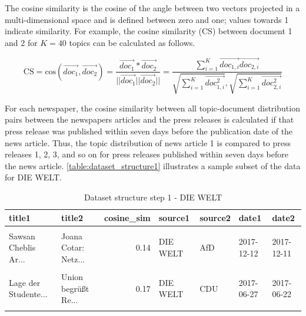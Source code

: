 \documentclass[
  12pt,
]{article}
\begin{document}
The cosine similarity is the cosine of the angle between two vectors
projected in a multi-dimensional space and is defined between zero and
one; values towards 1 indicate similarity. For example, the cosine
similarity (CS) between document 1 and 2 for \(K=40\) topics can be
calculated as follows.

\[
\text{CS} = \text{cos}(\vec{doc_1},\vec{doc_2})=\frac{\vec{doc_1}*\vec{doc_2}}{||\vec{doc_1}||\vec{doc_2}||}=\frac{\sum^K_{i=1} \vec{doc_{1,i}}\vec{doc_{2,i}}}{\sqrt{\sum^K_{i=1} \vec{doc^2_{1,i}}}, \sqrt{\sum^K_{i=1}\vec{doc^2_{2,i}}}}
\]

For each newspaper, the cosine similarity between all topic-document
distribution pairs between the newspapers articles and the press
releases is calculated if that press release was published within seven
days before the publication date of the news article. Thus, the topic
distribution of news article 1 is compared to press releases 1, 2, 3,
and so on for press releases published within seven days before the news
article. \autoref{table:dataset_structure1} illustrates a sample subset
of the data for DIE WELT.

\begin{table}[H]

\caption{\label{tab:Dataset structure 1}Dataset structure step 1 - DIE WELT \label{table:dataset_structure1}}
\centering
\fontsize{7}{9}\selectfont
\begin{tabular}[t]{llrllll}
\toprule
title1 & title2 & cosine\_sim & source1 & source2 & date1 & date2\\
\midrule
\cellcolor{gray!6}{Deutsche Bevölker...} & \cellcolor{gray!6}{Weidel/Gauland: K...} & \cellcolor{gray!6}{0.05} & \cellcolor{gray!6}{DIE WELT} & \cellcolor{gray!6}{AfD} & \cellcolor{gray!6}{2018-01-16} & \cellcolor{gray!6}{2018-01-16}\\
Sawsan Cheblis Ar... & Joana Cotar: Netz... & 0.14 & DIE WELT & AfD & 2017-12-12 & 2017-12-11\\
\cellcolor{gray!6}{Duisburg: OB prov...} & \cellcolor{gray!6}{Alice Weidel: NGO...} & \cellcolor{gray!6}{0.08} & \cellcolor{gray!6}{DIE WELT} & \cellcolor{gray!6}{AfD} & \cellcolor{gray!6}{2017-08-09} & \cellcolor{gray!6}{2017-08-03}\\
Lage der Studente... & Union begrüßt Re... & 0.17 & DIE WELT & CDU & 2017-06-27 & 2017-06-22\\
\cellcolor{gray!6}{Schleuserbande: D...} & \cellcolor{gray!6}{EU-Innenminister ...} & \cellcolor{gray!6}{0.12} & \cellcolor{gray!6}{DIE WELT} & \cellcolor{gray!6}{DIE LINKE} & \cellcolor{gray!6}{2018-01-31} & \cellcolor{gray!6}{2018-01-25}\\
\bottomrule
\end{tabular}
\end{table}
\end{document}

